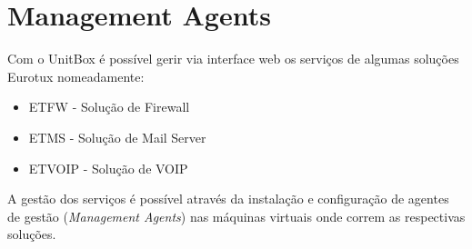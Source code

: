 
\chapter{\textsf{Management Agents}}

Com o UnitBox é possível gerir via interface web os serviços de algumas soluções Eurotux nomeadamente:
\begin{itemize}
	\item ETFW - Solução de Firewall
	\item ETMS - Solução de Mail Server
	\item ETVOIP - Solução de VOIP
\end{itemize}
    
    
A gestão dos serviços é possível através da instalação e configuração de agentes de gestão (\emph{Management Agents}) nas máquinas virtuais onde correm as respectivas soluções.



\pagebreak

\pagebreak




